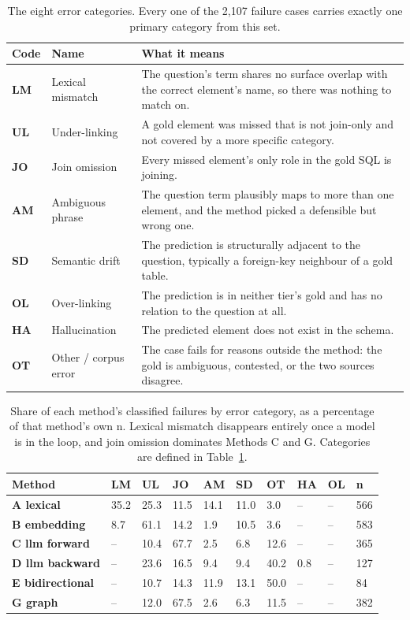 \begin{table}[htbp]
\centering
\caption{The eight error categories. Every one of the 2,107 failure cases carries exactly one primary category from this set.}\label{tab:5-5}
\setlength{\tabcolsep}{6pt}
\begin{tabular}{@{}>{\raggedright\arraybackslash}p{}>{\raggedright\arraybackslash}p{}>{\raggedright\arraybackslash}p{}@{}}
\toprule
\textbf{Code} & \textbf{Name} & \textbf{What it means}\tabularnewline
\midrule
\textbf{LM} & Lexical mismatch & The question's term shares no surface overlap with the correct element's name, so there was nothing to match on.\tabularnewline
\textbf{UL} & Under-linking & A gold element was missed that is not join-only and not covered by a more specific category.\tabularnewline
\textbf{JO} & Join omission & Every missed element's only role in the gold SQL is joining.\tabularnewline
\textbf{AM} & Ambiguous phrase & The question term plausibly maps to more than one element, and the method picked a defensible but wrong one.\tabularnewline
\textbf{SD} & Semantic drift & The prediction is structurally adjacent to the question, typically a foreign-key neighbour of a gold table.\tabularnewline
\textbf{OL} & Over-linking & The prediction is in neither tier's gold and has no relation to the question at all.\tabularnewline
\textbf{HA} & Hallucination & The predicted element does not exist in the schema.\tabularnewline
\textbf{OT} & Other / corpus error & The case fails for reasons outside the method: the gold is ambiguous, contested, or the two sources disagree.\tabularnewline
\bottomrule
\end{tabular}
\end{table}




\begin{table}[htbp]
\centering
\caption{Share of each method's classified failures by error category, as a percentage of that method's own n. Lexical mismatch disappears entirely once a model is in the loop, and join omission dominates Methods C and G. Categories are defined in Table~\ref{tab:5-5}.}\label{tab:5-6}
\footnotesize\setlength{\tabcolsep}{4pt}
\begin{tabular}{@{}llllllllll@{}}
\toprule
\textbf{Method} & \textbf{LM} & \textbf{UL} & \textbf{JO} & \textbf{AM} & \textbf{SD} & \textbf{OT} & \textbf{HA} & \textbf{OL} & \textbf{n}\tabularnewline
\midrule
\textbf{A lexical} & 35.2 & 25.3 & 11.5 & 14.1 & 11.0 & 3.0 & -- & -- & 566\tabularnewline
\textbf{B embedding} & 8.7 & 61.1 & 14.2 & 1.9 & 10.5 & 3.6 & -- & -- & 583\tabularnewline
\textbf{C llm forward} & -- & 10.4 & 67.7 & 2.5 & 6.8 & 12.6 & -- & -- & 365\tabularnewline
\textbf{D llm backward} & -- & 23.6 & 16.5 & 9.4 & 9.4 & 40.2 & 0.8 & -- & 127\tabularnewline
\textbf{E bidirectional} & -- & 10.7 & 14.3 & 11.9 & 13.1 & 50.0 & -- & -- & 84\tabularnewline
\textbf{G graph} & -- & 12.0 & 67.5 & 2.6 & 6.3 & 11.5 & -- & -- & 382\tabularnewline
\bottomrule
\end{tabular}
\end{table}






